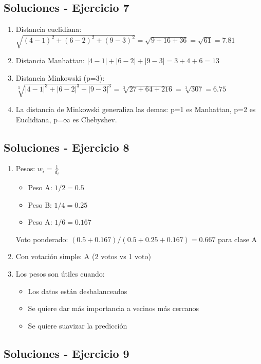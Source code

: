\documentclass[12pt]{article}
\begin{document}
\subsection{Soluciones - Ejercicio 7}

\begin{enumerate}
    \item Distancia euclidiana: $\sqrt{(4-1)^2 + (6-2)^2 + (9-3)^2} = \sqrt{9 + 16 + 36} = \sqrt{61} = 7.81$
    \item Distancia Manhattan: $|4-1| + |6-2| + |9-3| = 3 + 4 + 6 = 13$
    \item Distancia Minkowski (p=3): $\sqrt[3]{|4-1|^3 + |6-2|^3 + |9-3|^3} = \sqrt[3]{27 + 64 + 216} = \sqrt[3]{307} = 6.75$
    \item La distancia de Minkowski generaliza las demas: p=1 es Manhattan, p=2 es Euclidiana, p=$\infty$ es Chebyshev.
\end{enumerate}

\subsection{Soluciones - Ejercicio 8}

\begin{enumerate}
    \item Pesos: $w_i = \frac{1}{d_i}$
    \begin{itemize}
        \item Peso A: $1/2 = 0.5$
        \item Peso B: $1/4 = 0.25$
        \item Peso A: $1/6 = 0.167$
    \end{itemize}
    Voto ponderado: $(0.5 + 0.167) / (0.5 + 0.25 + 0.167) = 0.667$ para clase A
    \item Con votación simple: A (2 votos vs 1 voto)
    \item Los pesos son útiles cuando:
    \begin{itemize}
        \item Los datos están desbalanceados
        \item Se quiere dar más importancia a vecinos más cercanos
        \item Se quiere suavizar la predicción
    \end{itemize}
\end{enumerate}

\subsection{Soluciones - Ejercicio 9}
\end{document}

